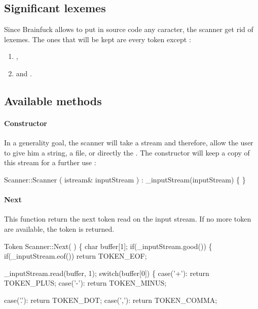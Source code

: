 \subsection{Significant lexemes\label{significantLexemes}}
Since Brainfuck allows to put in source code any caracter, the scanner get rid of lexemes. The ones that will be kept are every token except :
\begin{enumerate}
        \item {},
        \item and .
\end{enumerate}

\subsection{Available methods}
\paragraph{Constructor} 
In a generality goal, the scanner will take a stream and therefore, allow the user to give him a string, a file, or directly the . The constructor will keep a copy of this stream for a further use :

\nwenddocs{}\endmoddef\nwstartdeflinemarkup\nwenddeflinemarkup
Scanner::Scanner ( istream& inputStream ) 
: _inputStream(inputStream)
\{ \}
\nwendcode{}\nwdocspar

\paragraph{Next}
This function return the next token read on the input stream. If no more token are available, the token  is returned.

\nwenddocs{}\endmoddef\nwstartdeflinemarkup\nwenddeflinemarkup
Token Scanner::Next( ) \{
        char buffer[1];
        if(_inputStream.good()) \{
                if(_inputStream.eof()) return TOKEN_EOF;

                _inputStream.read(buffer, 1);
                switch(buffer[0]) \{
                        case('+'): return TOKEN_PLUS;
                        case('-'): return TOKEN_MINUS;
                                   
                        case('.'): return TOKEN_DOT;
                        case(','): return TOKEN_COMMA;

